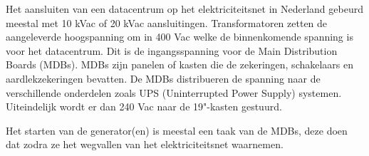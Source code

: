 Het aansluiten van een datacentrum op het elektriciteitsnet in Nederland gebeurd meestal met 10 kVac of 20 kVac aansluitingen. Transformatoren zetten de aangeleverde hoogspanning om in 400 Vac welke de binnenkomende spanning is voor het datacentrum. Dit is de ingangsspanning voor de Main Distribution Boards (MDBs). MDBs zijn panelen of kasten die de zekeringen, schakelaars en aardlekzekeringen bevatten. De MDBs distribueren de spanning naar de verschillende onderdelen zoals UPS (Uninterrupted Power Supply) systemen. Uiteindelijk wordt er dan 240 Vac naar de 19"-kasten gestuurd.

Het starten van de generator(en) is meestal een taak van de MDBs, deze doen dat zodra ze het wegvallen van het elektriciteitsnet waarnemen.

